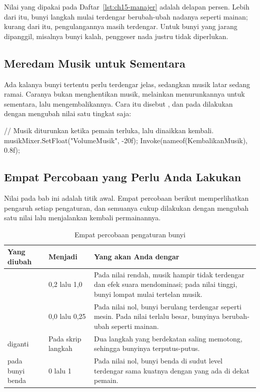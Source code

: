 Nilai yang dipakai pada Daftar~\ref{lst:ch15-manajer} adalah delapan persen.
Lebih dari itu, bunyi langkah mulai terdengar berubah-ubah nadanya seperti
mainan; kurang dari itu, pengulangannya masih terdengar. Untuk bunyi yang
jarang dipanggil, misalnya bunyi kalah, penggeser nada justru tidak diperlukan.

\subsection{Meredam Musik untuk Sementara}

Ada kalanya bunyi tertentu perlu terdengar jelas, sedangkan musik latar sedang
ramai. Caranya bukan menghentikan musik, melainkan menurunkannya untuk
sementara, lalu mengembalikannya. Cara itu disebut , dan pada
 dilakukan dengan mengubah nilai satu tingkat saja:

\begin{kodekeluaran}
// Musik diturunkan ketika pemain terluka, lalu dinaikkan kembali.
musikMixer.SetFloat("VolumeMusik", -20f);
Invoke(nameof(KembalikanMusik), 0.8f);
\end{kodekeluaran}

\subsection{Empat Percobaan yang Perlu Anda Lakukan}

Nilai pada bab ini adalah titik awal. Empat percobaan berikut memperlihatkan
pengaruh setiap pengaturan, dan semuanya cukup dilakukan dengan mengubah satu
nilai lalu menjalankan kembali permainannya.

\begin{table}[htbp]
\centering
\caption{Empat percobaan pengaturan bunyi}
\label{tab:percobaan-bunyi}
{\setlength{\tabcolsep}{4pt}\footnotesize%
\begin{tabularx}{\textwidth}{@{}L{3.6cm} L{3.4cm} Y@{}}
\toprule
\headrow \textbf{Yang diubah} & \textbf{Menjadi} & \textbf{Yang akan Anda dengar} \\
\midrule
{} & 0,2 lalu 1,0 &
Pada nilai rendah, musik hampir tidak terdengar dan efek suara mendominasi;
pada nilai tinggi, bunyi lompat mulai tertelan musik. \\
\addlinespace
{} & 0,0 lalu 0,25 &
Pada nilai nol, bunyi berulang terdengar seperti mesin. Pada nilai terlalu
besar, bunyinya berubah-ubah seperti mainan. \\
\addlinespace
{} diganti  &
Pada skrip langkah &
Dua langkah yang berdekatan saling memotong, sehingga bunyinya terputus-putus. \\
\addlinespace
{} pada bunyi benda &
0 lalu 1 &
Pada nilai nol, bunyi benda di sudut level terdengar sama kuatnya dengan yang
ada di dekat pemain. \\
\bottomrule
\end{tabularx}}
\end{table}
